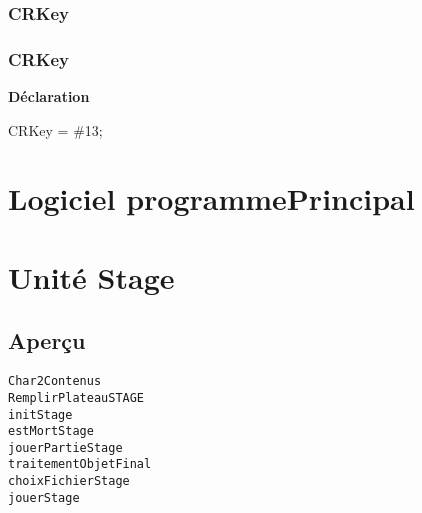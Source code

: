 \documentclass{report}
\newif\ifpdf
\begin{document}
\subsection*{\large{\textbf{CRKey}}\normalsize\hspace{1ex}\hrulefill}
\else
\subsection*{CRKey}
\fi
\label{LesMenus-CRKey}
\begin{list}{}{
\setlength{\itemindent}{0cm}
\setlength{\listparindent}{0cm}
\setlength{\leftmargin}{\evensidemargin}
\addtolength{\leftmargin}{\tmplength}
\settowidth{\labelsep}{X}
\addtolength{\leftmargin}{\labelsep}
\setlength{\labelwidth}{\tmplength}
}
\item[\textbf{Déclaration}\hfill]
\ifpdf
\begin{flushleft}
\fi
\begin{ttfamily}
CRKey = {\#}13;\end{ttfamily}

\ifpdf
\end{flushleft}
\fi

\end{list}
\chapter{Logiciel programmePrincipal}
\label{programmePrincipal}
\chapter{Unité Stage}
\label{Stage}
\section{Aperçu}
\begin{description}
\item[\texttt{Char2Contenus}]
\item[\texttt{RemplirPlateauSTAGE}]
\item[\texttt{initStage}]
\item[\texttt{estMortStage}]
\item[\texttt{jouerPartieStage}]
\item[\texttt{traitementObjetFinal}]
\item[\texttt{choixFichierStage}]
\item[\texttt{jouerStage}]
\end{description}
\end{document}
